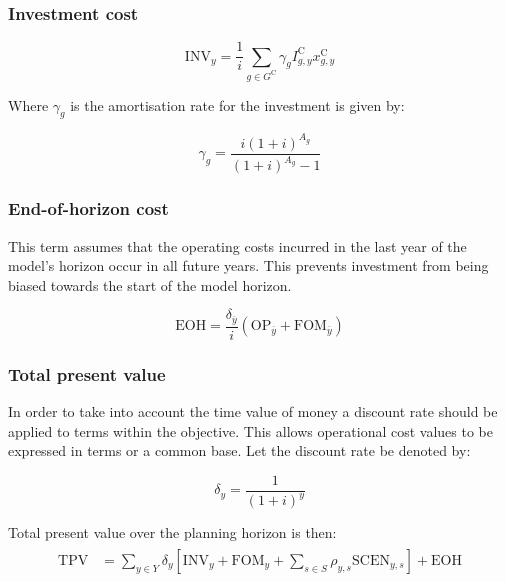 \documentclass{article}
\newcommand{\sGeneratorsCandidate}{G^{\mathrm{C}}}
\newcommand{\sYears}{Y}
\newcommand{\sScenarios}{S}
\newcommand{\iGenerator}{g}
\newcommand{\iYear}{y}
\newcommand{\iYearTerminal}{\overline{\iYear}}
\newcommand{\iScenario}{s}
\newcommand{\cOperatingCost}[1][\iYear,\iScenario]{\mathrm{OP}_{#1}}
\newcommand{\cFixedOperationsMaintenanceCost}[1][\iYear]{\mathrm{FOM}_{#1}}
\newcommand{\cScenarioDuration}[1][\iYear,\iScenario]{\rho_{#1}}
\newcommand{\cAmortisationRate}[1][\iGenerator]{\gamma_{#1}}
\newcommand{\cCandidateInvestmentCost}[1][\iGenerator,\iYear]{I^{\mathrm{C}}_{#1}}
\newcommand{\cInvestmentCost}[1][\iYear]{\mathrm{INV}_{#1}}
\newcommand{\cInterestRate}{i}
\newcommand{\cAssetLifetime}[1][\iGenerator]{A_{#1}}
\newcommand{\cTotalPresentValue}[1][]{\mathrm{TPV}_{#1}}
\newcommand{\cOperatingCostScenario}[1][\iYear,\iScenario]{\mathrm{SCEN}_{#1}}
\newcommand{\cDiscountRate}[1][\iYear]{\delta_{#1}}
\newcommand{\vInstalledCapacity}[1][\iGenerator,\iYear]{x^{\mathrm{C}}_{#1}}
\newcommand{\cEndOfHorizonCost}{\textrm{EOH}}
\begin{document}
\subsubsection{Investment cost}

\begin{equation}
	\cInvestmentCost = \frac{1}{\cInterestRate}\sum\limits_{g\in \sGeneratorsCandidate} \cAmortisationRate  \cCandidateInvestmentCost \vInstalledCapacity
\end{equation}

Where $\cAmortisationRate$ is the amortisation rate for the investment is given by:

\begin{equation}
	\cAmortisationRate = \frac{\cInterestRate(1+\cInterestRate)^{\cAssetLifetime}}{(1+\cInterestRate)^{\cAssetLifetime} - 1}
\end{equation}

\subsubsection{End-of-horizon cost}
This term assumes that the operating costs incurred in the last year of the model's horizon occur in all future years. This prevents investment from being biased towards the start of the model horizon.

\begin{equation}
	\cEndOfHorizonCost = \frac{\cDiscountRate[\iYearTerminal]}{\cInterestRate} \left(\cOperatingCost[\iYearTerminal] + \cFixedOperationsMaintenanceCost[\iYearTerminal] \right)
\end{equation}

\subsubsection{Total present value}
In order to take into account the time value of money a discount rate should be applied to terms within the objective. This allows operational cost values to be expressed in terms or a common base. Let the discount rate be denoted by:

\begin{equation}
	\cDiscountRate = \frac{1}{(1 + \cInterestRate)^{\iYear}}
\end{equation}

Total present value over the planning horizon is then:
\begin{align}
	\begin{split}
		\cTotalPresentValue & = \sum\limits_{\iYear \in \sYears} \cDiscountRate \left[\cInvestmentCost + \cFixedOperationsMaintenanceCost + \sum\limits_{\iScenario \in \sScenarios} \cScenarioDuration \cOperatingCostScenario\right] + \cEndOfHorizonCost
	\end{split}
\end{align}
\end{document}
